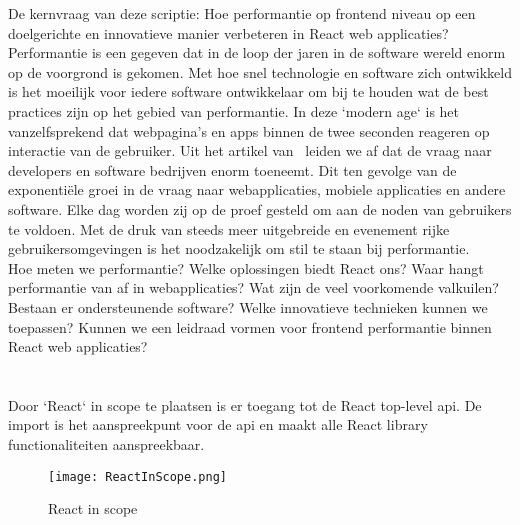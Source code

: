 De kernvraag van deze scriptie: Hoe performantie op frontend niveau op een doelgerichte en innovatieve manier verbeteren in React web applicaties?\\
Performantie is een gegeven dat in de loop der jaren in de software wereld enorm op de voorgrond is gekomen. Met hoe snel technologie en software zich ontwikkeld is het moeilijk voor iedere software ontwikkelaar om bij te houden wat de best practices zijn op het gebied van performantie. In deze `modern age` is het vanzelfsprekend dat webpagina's en apps binnen de twee seconden reageren op interactie van de gebruiker. Uit het artikel van~\textcite{Mazaika2017} leiden we af dat de vraag naar developers en software bedrijven enorm toeneemt. Dit ten gevolge van de exponentiële groei in de vraag naar webapplicaties, mobiele applicaties en andere software. Elke dag worden zij op de proef gesteld om aan de noden van gebruikers te voldoen. Met de druk van steeds meer uitgebreide en evenement rijke gebruikersomgevingen is het noodzakelijk om stil te staan bij performantie.\\
Hoe meten we performantie? Welke oplossingen biedt React ons? Waar hangt performantie van af in webapplicaties? Wat zijn de veel voorkomende valkuilen? Bestaan er ondersteunende software? Welke innovatieve technieken kunnen we toepassen? Kunnen we een leidraad vormen voor frontend performantie binnen React web applicaties?


\section{}
\label{sec:reactComponenten}

Door `React` in scope te plaatsen is er toegang tot de React top-level \gls{api}. De import is het aanspreekpunt voor de \gls{api} en maakt alle React library functionaliteiten aanspreekbaar.

\begin{figure}[H]
    \texttt{[image: ReactInScope.png]}
    \caption{React in scope}
    \label{fig:reactImport}
\end{figure}

\subsection{}
\label{sec:pureComponent}

